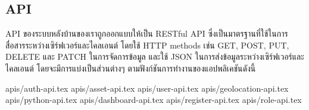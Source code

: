 \subsection{API}

\ifenglish
\else
API ของระบบหลังบ้านของเราถูกออกแบบให้เป็น RESTful API ซึ่งเป็นมาตรฐานที่ใช้ในการสื่อสารระหว่างเซิร์ฟเวอร์และไคลเอนต์ โดยใช้ HTTP methods เช่น GET, POST, PUT, DELETE และ PATCH ในการจัดการข้อมูล และใช้ JSON ในการส่งข้อมูลระหว่างเซิร์ฟเวอร์และไคลเอนต์ โดยจะมีการแบ่งเป็นส่วนต่างๆ ตามฟังก์ชันการทำงานของแอปพลิเคชันดังนี้

{apis/auth-api.tex}
{apis/asset-api.tex}
{apis/user-api.tex}
{apis/geolocation-api.tex}
{apis/python-api.tex}
{apis/dashboard-api.tex}
{apis/register-api.tex}
{apis/role-api.tex}
\fi